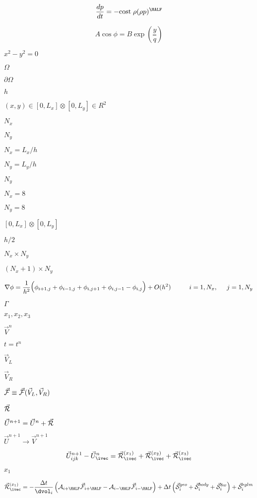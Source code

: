 \documentclass{article}
\begin{document}
\[
    \frac{dp}{dt} = -{\rm cost} \;\rho  (\rho p)^{\HALF}
\]
\pagebreak

\[
        A\cos\phi = B\exp\left(\frac{y}{q}\right)
  \]
\pagebreak

$ x^2-y^2 = 0$
\pagebreak

$ \Omega $
\pagebreak

$ \partial\Omega $
\pagebreak

$ h $
\pagebreak

$ (x,y) \in [0, L_x] \otimes [0,L_y]\in R^2 $
\pagebreak

$ N_x $
\pagebreak

$ N_y $
\pagebreak

$ N_x = L_x / h $
\pagebreak

$ N_y = L_y / h $
\pagebreak

$ N_y$
\pagebreak

$ N_x=8 $
\pagebreak

$ N_y=8 $
\pagebreak

$ [0, L_x] \otimes [0,L_y]$
\pagebreak

$ h/2 $
\pagebreak

$ N_x \times N_y $
\pagebreak

$ (N_x+1) \times N_y$
\pagebreak

\[ 
   \Large{ \nabla \phi = \frac{1}{h^2} \big( \phi_{i+1,j} + \phi_{i-1,j} +
                  \phi_{i,j+1} + \phi_{i,j-1} - \phi_{i,j}\big) +
                  O(h^2) \qquad i=1,N_x,\quad j=1,N_y\Large}
\]
\pagebreak

$ \Gamma $
\pagebreak

$ x_1, x_2, x_3 $
\pagebreak

$ \vec{V}^n$
\pagebreak

$t=t^n$
\pagebreak

$ \vec{V}_L $
\pagebreak

$ \vec{V}_R $
\pagebreak

$ \vec{\cal F} \equiv
    \vec{\cal F}(\vec{V}_L, \vec{V}_R)$
\pagebreak

$\vec{\cal R}$
\pagebreak

$ \vec{U}^{n+1} = \vec{U}^n + \vec{\cal R}$
\pagebreak

$ \vec{U}^{n+1}\to \vec{V}^{n+1} $
\pagebreak

\[
   \vec{U}^{n+1}_{ijk} - \vec{U}^n_{\ivec} = 
      \vec{\cal R}^{(x_1)}_{\ivec} 
    + \vec{\cal R}^{(x_2)}_{\ivec} 
    + \vec{\cal R}^{(x_3)}_{\ivec}
 \]
\pagebreak

$ x_1 $
\pagebreak

\[
 \vec{\cal R}^{(x_1)}_{\ivec} = -\frac{\Delta t}{\dvol_i}
 \left( {\cal A}_{i+\HALF}\vec{\cal F}_{i+\HALF} 
      - {\cal A}_{i-\HALF}\vec{\cal F}_{i-\HALF}\right)
 + \Delta t\left(\vec{\cal S}^{geo}_i + \vec{\cal S}^{body}_i 
 + \vec{\cal S}^{8w}_i\right) +\vec{\cal S}^{eglm}_i
 \]
\pagebreak
\end{document}
